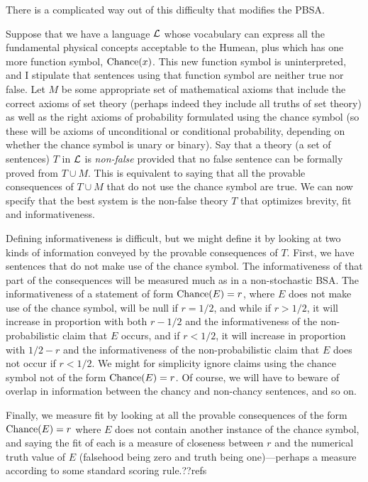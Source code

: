 There is a complicated way out of this difficulty that modifies the PBSA.

Suppose that we have a language $\mathcal L$ whose vocabulary can express all the fundamental physical concepts acceptable to 
the Humean, plus which has one more function symbol, $\operatorname{Chance}(x)$. This new function symbol is uninterpreted, and I stipulate that sentences using that function symbol are 
neither true nor false. Let $M$ be some appropriate set of mathematical axioms that include the correct axioms of set theory (perhaps indeed
they include all truths of set theory) as well as the 
right axioms of probability formulated using the chance symbol (so these will be axioms of unconditional or conditional probability, depending 
on whether the chance symbol is unary or binary).  Say that a theory (a set of sentences) $T$ in $\mathcal L$ is \textit{non-false} provided that 
no false sentence can be formally proved from $T\cup M$. This is equivalent to saying that all the provable consequences of $T\cup M$ that do 
not use the chance symbol are true. We can now specify that the best system is the non-false theory $T$ that optimizes brevity, fit and 
informativeness. 

Defining informativeness is difficult, but we might define it by looking at two kinds of information conveyed by the 
provable consequences of $T$. First, we have sentences that do not make use of the chance symbol. The informativeness
of that part of the consequences will be measured much as in a non-stochastic BSA. The informativeness of a statement
of form $\operatorname{Chance}(E)=r$, where $E$ does not make use of the chance symbol, will be null if $r=1/2$, and while if $r>1/2$, it will increase in proportion with both $r-1/2$ 
and the informativeness of the non-probabilistic claim that $E$ occurs, and if $r<1/2$, it will increase in proportion 
with $1/2-r$ and the informativeness of the non-probabilistic claim that $E$ does not occur if $r<1/2$. We might for
simplicity ignore claims using the chance symbol not of the form $\operatorname{Chance}(E)=r$. Of course, we
will have to beware of overlap in information between the chancy and non-chancy sentences, and so on. 

Finally, we measure fit by looking at all the provable consequences of the form $\operatorname{Chance}(E)=r$ where $E$ does not contain another
instance of the chance symbol, and saying the fit of each is a measure of closeness between $r$ and the numerical truth value of $E$ (falsehood
being zero and truth being one)---perhaps a measure according to some standard scoring rule.??refs

